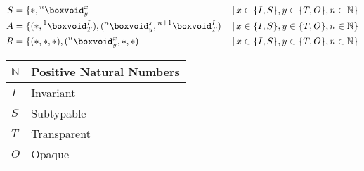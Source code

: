 \documentclass[preview]{standalone}
\begin{document}
\begin{align*}
S &= \{*, \prescript {n} {} \boxvoid^x_y \, & | \, x \in \{I, S\}, y \in \{T, O\}, n \in \mathbb{N} \} \\
A &= \{(*, \prescript {1} {} \boxvoid^I_T), (\prescript {n} {} \boxvoid^x_y, \prescript{n+1} {} \boxvoid^I_T )
\, & | \, x \in \{I, S\}, y \in \{T, O\}, n \in \mathbb{N}\} \\
R &= \{(*,*,*), (\prescript {n} {} \boxvoid^x_y,*,*) \, & | \, x \in \{I, S\}, y \in \{T, O\}, n \in \mathbb{N} \} \\
\end{align*}
\begin{center}
\begin{tabular}{ | l | l | }
\hline
$ \mathbb{N} $ & Positive Natural Numbers \\
\hline
$ I $ & Invariant \\
\hline
$ S $ & Subtypable \\
\hline
$ T $ & Transparent \\
\hline
$ O $ & Opaque \\
\hline
\end{tabular}
\end{center}
\end{document}
